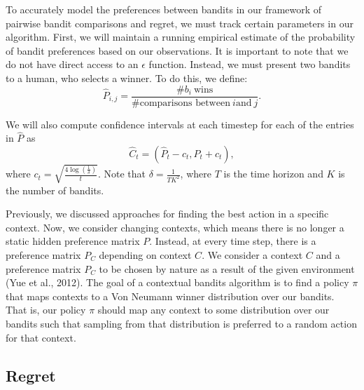 \documentclass[
  letterpaper,
  numbers=noenddot,
  DIV=11]{scrreprt}
\theoremstyle{definition}
\theoremstyle{plain}
\theoremstyle{plain}
\theoremstyle{remark}
\begin{document}
To accurately model the preferences between bandits in our framework of
pairwise bandit comparisons and regret, we must track certain parameters
in our algorithm. First, we will maintain a running empirical estimate
of the probability of bandit preferences based on our observations. It
is important to note that we do not have direct access to an
\(\epsilon\) function. Instead, we must present two bandits to a human,
who selects a winner. To do this, we define:
\[\hat{P}_{i, j} = \frac{\# b_i\ \text{wins}}{\# \text{comparisons between}\ i \text{and}\ j}.\]

We will also compute confidence intervals at each timestep for each of
the entries in \(\hat{P}\) as
\[\hat{C}_t = \left( \hat{P}_t - c_t, \hat{P}_t + c_t \right),\] where
\(c_t = \sqrt{\frac{4\log(\frac{1}{\delta})}{t}}\). Note that
\(\delta = \frac{1}{TK^2}\), where \(T\) is the time horizon and \(K\)
is the number of bandits.

Previously, we discussed approaches for finding the best action in a
specific context. Now, we consider changing contexts, which means there
is no longer a static hidden preference matrix \(P\). Instead, at every
time step, there is a preference matrix \(P_C\) depending on context
\(C\). We consider a context \(C\) and a preference matrix \(P_C\) to be
chosen by nature as a result of the given environment (Yue et al.,
2012). The goal of a contextual bandits algorithm is to find a policy
\(\pi\) that maps contexts to a Von Neumann winner distribution over our
bandits. That is, our policy \(\pi\) should map any context to some
distribution over our bandits such that sampling from that distribution
is preferred to a random action for that context.

\subsection{Regret}\label{regret}
\end{document}
